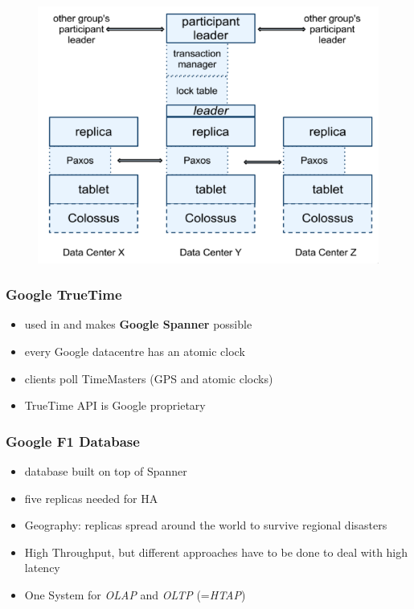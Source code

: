 \documentclass[a4paper]{article}
\begin{document}
\begin{multicols}{3}
\begin{figure}[H]
    \includegraphics[width=\linewidth]{ZoneSoftwareStack.png}
    \label{fig:zonesoftwarestack}
\end{figure}

\subsubsection{Google TrueTime}
\begin{itemize}
    \item used in and makes \textbf{Google Spanner} possible
    \item every Google datacentre has an atomic clock
    \item clients poll TimeMasters (GPS and atomic clocks)
    \item TrueTime API is Google proprietary
\end{itemize}

\subsubsection{Google F1 Database}
\begin{itemize}
    \item database built on top of Spanner
    \item five replicas needed for HA
    \item Geography: replicas spread around the world to survive regional disasters
    \item High Throughput, but different approaches have to be done to deal with high latency
    \item One System for \textit{OLAP} and \textit{OLTP} (=\textit{HTAP})
\end{itemize}


\end{multicols}
\end{document}
